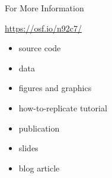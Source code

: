 \appendix

\begin{frame}{For More Information}

\vspace{1ex}

{\HUGE\url{https://osf.io/n92c7/}}

\vspace{3ex}

\begin{itemize}
\item source code
\item data
\item figures and graphics
\item how-to-replicate tutorial
\item publication
\item slides
\item blog article
\end{itemize}

\end{frame}

